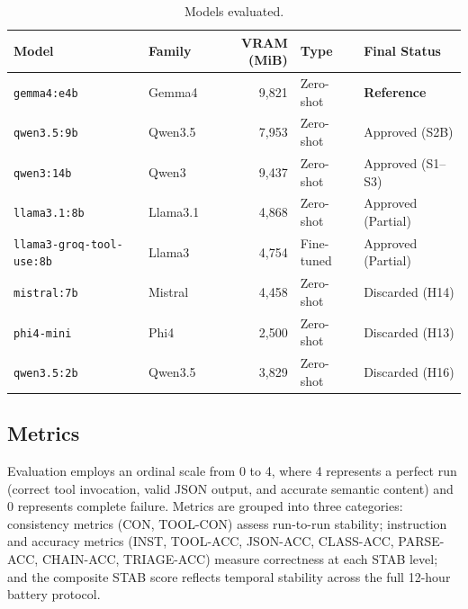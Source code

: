 \documentclass{kdmile}
\begin{document}
\begin{table}[H]
\centering
\caption{Models evaluated.}
\label{tab:models}
\begin{tabular}{llrll}
\toprule
\textbf{Model} & \textbf{Family} & \textbf{VRAM (MiB)} & \textbf{Type} & \textbf{Final Status} \\
\midrule
\texttt{gemma4:e4b}             & Gemma4    & 9{,}821 & Zero-shot  & \textbf{Reference} \\
\texttt{qwen3.5:9b}             & Qwen3.5   & 7{,}953 & Zero-shot  & Approved (S2B) \\
\texttt{qwen3:14b}              & Qwen3     & 9{,}437 & Zero-shot  & Approved (S1--S3) \\
\texttt{llama3.1:8b}            & Llama3.1  & 4{,}868 & Zero-shot  & Approved (Partial) \\
\texttt{llama3-groq-tool-use:8b}& Llama3    & 4{,}754 & Fine-tuned & Approved (Partial) \\
\texttt{mistral:7b}             & Mistral   & 4{,}458 & Zero-shot  & Discarded (H14) \\
\texttt{phi4-mini}              & Phi4      & 2{,}500 & Zero-shot  & Discarded (H13) \\
\texttt{qwen3.5:2b}             & Qwen3.5   & 3{,}829 & Zero-shot  & Discarded (H16) \\
\bottomrule
\end{tabular}
\end{table}

\subsection{Metrics}

Evaluation employs an ordinal scale from 0 to 4, where 4 represents a perfect
run (correct tool invocation, valid JSON output, and accurate semantic content)
and 0 represents complete failure. Metrics are grouped into three categories:
consistency metrics (CON, TOOL-CON) assess run-to-run stability; instruction and
accuracy metrics (INST, TOOL-ACC, JSON-ACC, CLASS-ACC, PARSE-ACC, CHAIN-ACC,
TRIAGE-ACC) measure correctness at each STAB level; and the composite STAB score
reflects temporal stability across the full 12-hour battery protocol.
\end{document}
